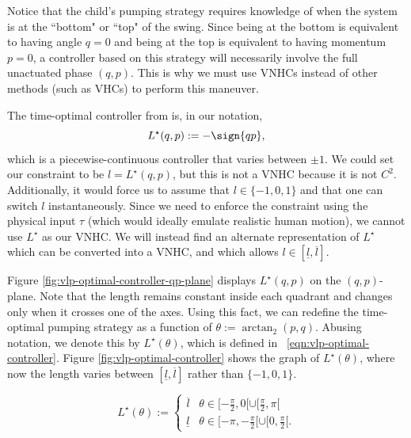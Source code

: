 Notice that the child's pumping strategy requires knowledge of
when the system is at the ``bottom" or ``top" of the swing. 
Since being at the bottom is equivalent to having angle \(q = 0\) and being
at the top is equivalent to having momentum \(p = 0\), a controller based on
this strategy will necessarily involve the full unactuated phase \((q,p)\). 
This is why we must use VNHCs instead of other methods (such as VHCs) 
to perform this maneuver.

The time-optimal controller from \cite{pumping_swing_standing_squatting} is, in
our notation,
\[
   L^\star(q,p) := -\sign{qp}
   ,
\]
which is a piecewise-continuous controller that varies between \(\pm 1\). 
We could set our constraint to be \(l = L^\star(q,p)\), but this is not a VNHC
because it is not \(C^2\).
Additionally, it would force us to assume that \(l \in \{-1,0,1\}\) and that one
can switch \(l\) instantaneously.
Since we need to enforce the constraint using the physical input \(\tau\) (which
would ideally emulate realistic human motion), we cannot use \(L^\star\) as our
VNHC.
We will instead find an alternate representation of \(L^\star\) which can be
converted into a VNHC, and which allows 
\(l \in [\underline{l},\overline{l}]\).

Figure \ref{fig:vlp-optimal-controller-qp-plane} displays \(L^\star(q,p)\) 
on the \((q,p)\)-plane.
Note that the length remains constant inside each quadrant and changes only when it
crosses one of the axes. Using this fact, we can redefine
the time-optimal pumping strategy as a function of 
\(\theta := \arctan_2(p,q)\).
Abusing notation, we denote this by \(L^\star(\theta)\), which is defined in
~\eqref{eqn:vlp-optimal-controller}.
Figure \ref{fig:vlp-optimal-controller} shows the graph of \(L^\star(\theta)\), 
where now the length varies between \([\underline{l},\overline{l}]\) rather than 
\(\{-1,0,1\}\). 

\begin{equation}\label{eqn:vlp-optimal-controller}
   L^\star(\theta):= \begin{cases}
      \overline{l} & \theta \in [-\frac{\pi}{2},0[ \cup [\frac{\pi}{2}, \pi[ \\
      \underline{l} & \theta \in [-\pi, -\frac{\pi}{2}[ \cup [0,\frac{\pi}{2}[ 
      .
   \end{cases}
\end{equation}

